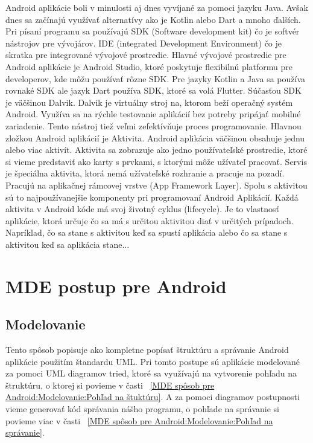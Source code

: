 \documentclass[10pt,twoside,slovak,a4paper]{article}
\begin{document}
Android aplikácie boli v minulosti aj dnes vyvíjané za pomoci jazyku Java. Avšak dnes sa začínajú využívať alternatívy ako je Kotlin alebo Dart a mnoho ďalších. Pri písaní programu sa používajú SDK (Software development kit) čo je softvér nástrojov pre vývojárov. IDE (integrated Development Environment) čo je skratka pre integrované vývojové prostredie. \newline
Hlavné vývojové prostredie pre Android aplikácie je Android Studio, ktoré poskytuje flexibilnú platformu pre developerov, kde môžu používať rôzne SDK. Pre jazyky Kotlin a Java sa používa rovnaké SDK ale jazyk Dart používa SDK, ktoré sa volá Flutter. \newline
Súčasťou SDK je väčšinou Dalvik. Dalvik je virtuálny stroj na, ktorom beží operačný systém Android. Využíva sa na rýchle testovanie aplikácií bez potreby pripájať mobilné zariadenie. Tento nástroj tiež veľmi zefektívňuje proces programovanie.\newline
Hlavnou zložkou Android aplikácií je Aktivita. Android aplikácia väčšinou obsahuje jednu alebo viac aktivít. Aktivita sa zobrazuje ako jedno používateľské prostredie, ktoré si vieme predstaviť ako karty s prvkami, s ktorými môže užívateľ pracovať.\newline
Servis je špeciálna aktivita, ktorá nemá užívateľské rozhranie a pracuje na pozadí. Pracujú na aplikačnej rámcovej vrstve (App Framework Layer). Spolu s aktivitou sú to najpoužívanejšie komponenty pri programovaní Android Aplikácií. \newline
Každá aktivita v Android kóde má svoj životný cyklus (lifecycle). Je to vlastnosť aplikácie, ktorá určuje čo sa má s určitou aktivitou diať v určitých prípadoch. Napríklad, čo sa stane s aktivitou keď sa spustí aplikácia alebo čo sa stane s aktivitou keď sa aplikácia stane... \cite{VývojAndroid}








\section{MDE postup pre Android} \label{MDE spôsob pre Android}

\subsection{Modelovanie}\label{MDE spôsob pre Android:Modelovanie}
Tento spôsob popisuje ako kompletne popísať štruktúru a správanie Android aplikácie použitím štandardu UML. \newline
Pri tomto postupe sú aplikácie modelované za pomoci UML diagramov tried, ktoré sa využívajú na vytvorenie pohľadu na štruktúru, o ktorej si povieme v časti ~\ref{MDE spôsob pre Android:Modelovanie:Pohľad na štuktúru}. A za pomoci diagramov postupnosti vieme generovať kód správania nášho programu, o pohľade na správanie si povieme viac v časti ~\ref{MDE spôsob pre Android:Modelovanie:Pohľad na správanie}. \cite{GenerovanieAndroid}
\end{document}
